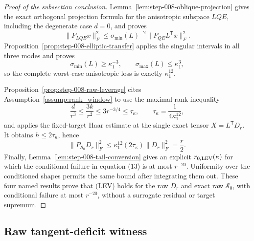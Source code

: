 \begin{proof}[Proof of the subsection conclusion]

Lemma~\ref{lem:step-008-oblique-projection} gives the exact orthogonal
projection formula for the anisotropic subspace \(LQE\), including the
degenerate case \(d=0\), and proves
\[
  \|P_{LQE}x\|_F^2
  \le\sigma_{\min}(L)^{-2}\|P_{QE}L^{\mathsf T}x\|_F^2.
\]
Proposition~\ref{prop:step-008-elliptic-transfer} applies the singular intervals in all three modes and proves
\[
  \sigma_{\min}(L)\ge\kappa_1^{-3},
  \qquad
  \sigma_{\max}(L)\le\kappa_1^3,
\]
so the complete worst-case anisotropic loss is exactly
\(\kappa_1^{12}\).

Proposition~\ref{prop:step-008-raw-leverage} cites
Assumption~\ref{assump:rank_window} to use the maximal-rank inequality
\[
  \frac d{r^3}\le\frac{3k}{r^2}\le3r^{-3/4}
  \le\tau_\kappa,
  \qquad
  \tau_\kappa=\frac1{4\kappa_1^{12}},
\]
and applies the fixed-target Haar estimate at the single exact
tensor \(X=L^{\mathsf T}D_r\). It obtains
\(h\le2\tau_\kappa\), hence
\[
  \|P_{\mathscr S_0}D_r\|_F^2
  \le\kappa_1^{12}(2\tau_\kappa)\|D_r\|_F^2
  =\frac r2.
\]
Finally, Lemma~\ref{lem:step-008-tail-conversion} gives an explicit
\(r_{0,\rm LEV}(\kappa)\) for which the conditional failure in equation
(13) is at most \(r^{-20}\). Uniformity over the conditioned shapes permits
the same bound after integrating them out. These four named results prove
that (LEV) holds for the raw \(D_r\) and exact raw
\(\mathscr S_0\), with conditional failure at most \(r^{-20}\), without a
surrogate residual or target supremum.

\end{proof}

\subsection{Raw tangent-deficit witness}\label{app:step-009}

